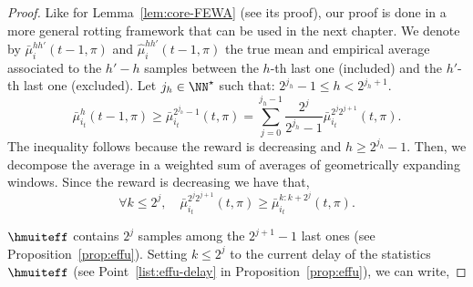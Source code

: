 \begin{proof}
Like for Lemma~\ref{lem:core-FEWA} (see its proof), our proof is done in a more general rotting framework that can be used in the next chapter. We denote by $\bar{\mu}^{hh'}_i(t-1,\pi)$ and $\hat{\mu}^{hh'}_i(t-1,\pi)$ the true mean and empirical average associated to the $h'-h$ samples between the $h$-th last one (included) and the $h'$-th last one (excluded). Let $j_h \in \NN^\star$ such that:
$2^{j_h} -1 \leq  h < 2^{j_h+1}$.
\begin{equation}
\label{eq:eff-decompo}
\bar{\mu}^{h}_{i_t}(t-1,\pi) \geq \bar{\mu}^{2^{j_h}-1}_{i_t}(t, \pi) = \sum_{j=0}^{j_h-1} \frac{2^j}{2^{j_h}-1} \bar{\mu}^{2^{j}2^{j+1}}_{i_t}(t, \pi).
\end{equation}
The inequality follows because the reward is decreasing and $h\geq 2^{j_h}-1$. Then, we decompose the average in a weighted sum of averages of geometrically expanding windows. Since the reward is decreasing we have that,
\begin{equation*}
\forall k \leq 2^j, \quad \bar{\mu}^{2^{j}2^{j+1}}_{i_t}(t, \pi) \geq \bar{\mu}^{k : k+2^{j}}_{i_t}(t, \pi).
\end{equation*}

$\hmuiteff$ contains $2^j$ samples among the $2^{j+1}-1$ last ones (see Proposition~\ref{prop:effu}). Setting $k\leq 2^j$ to the current delay of the statistics $\hmuiteff$ (see Point~\ref{list:effu-delay} in Proposition~\ref{prop:effu}), we can write,


\end{proof}
